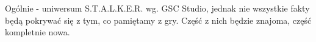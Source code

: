 \documentclass[./MAIN.tex]{subfiles}
\begin{document}
Ogólnie - uniwersum S.T.A.L.K.E.R. wg. GSC Studio, jednak nie wszystkie fakty będą pokrywać się z tym, co pamiętamy z gry. Część z nich będzie znajoma, część kompletnie nowa.
\end{document}
